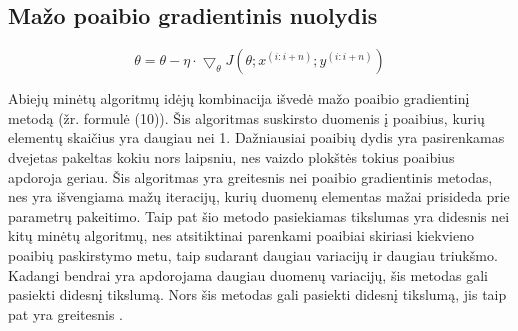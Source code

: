 \documentclass{VUMIFInfKursinis}
\begin{document}
\subsection{Mažo poaibio gradientinis nuolydis}
\begin{equation}
\theta = \theta - \eta \cdot \bigtriangledown_{\theta}J(\theta;x^{(i:i+n)};y^{(i:i+n)})
\end{equation}
\par
Abiejų minėtų algoritmų idėjų kombinacija išvedė mažo poaibio gradientinį metodą (žr. formulė (10)).
Šis algoritmas suskirsto duomenis į poaibius, kurių elementų skaičius yra daugiau nei 1.
Dažniausiai poaibių dydis yra pasirenkamas dvejetas pakeltas kokiu nors laipsniu, nes
vaizdo plokštės tokius poaibius apdoroja geriau. Šis algoritmas yra greitesnis nei poaibio
gradientinis metodas, nes yra išvengiama mažų iteracijų, kurių duomenų elementas mažai
prisideda prie parametrų pakeitimo. Taip pat šio metodo pasiekiamas tikslumas yra didesnis
nei kitų minėtų algoritmų, nes atsitiktinai parenkami poaibiai skiriasi kiekvieno
poaibių paskirstymo metu, taip sudarant daugiau variacijų ir daugiau triukšmo. Kadangi
bendrai yra apdorojama daugiau duomenų variacijų, šis metodas gali pasiekti didesnį
tikslumą. Nors šis metodas gali pasiekti didesnį tikslumą, jis taip pat yra greitesnis \cite{salt9}.

\end{document}
